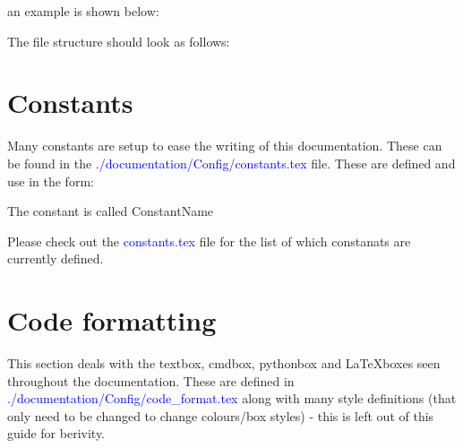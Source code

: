 \begin{itemize}
\begin{minipage}[t]{\textwidth}
	\noindent an example is shown below:
	\begin{latexbox}
	The file structure should look as follows:
\begin{tcustomdir}
\end{tcustomdir}
	\end{latexbox}
	\end{minipage}

\end{itemize}


\clearpage
\newpage
\section{Constants}
\label{ch:documentation:constants}

Many constants are setup to ease the writing of this documentation. These can be found in the \textcolor{blue}{./documentation/Config/constants.tex} file. These are defined and use in the form:
\begin{latexbox}
\newcommand{\ConstantName}{ConstantName}
The constant is called \ConstantName
\end{latexbox}

\noindent Please check out the \textcolor{blue}{constants.tex} file for the list of which constanats are currently defined.

\section{Code formatting}
\label{ch:documentation:code_format}

This section deals with the textbox, cmdbox, pythonbox and \LaTeX boxes seen throughout the documentation. These are defined in \textcolor{blue}{./documentation/Config/code\_format.tex} along with many style definitions (that only need to be changed to change colours/box styles) - this is left out of this guide for berivity.


